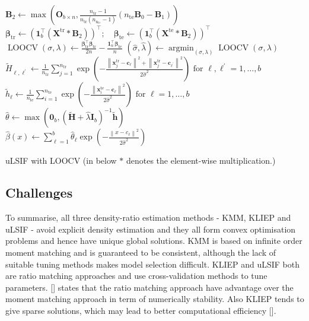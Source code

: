 \documentclass[a4paper,12pt]{article}
\begin{document}
\begin{algorithm}
{{$\boldsymbol{B}_{2} \longleftarrow \max \left(\boldsymbol{O}_{b \times n}, \frac{n_{\mathrm{tr}}-1}{n_{\mathrm{tr}}\left(n_{\mathrm{n}_{te}}-1\right)}\left(n_{\mathrm{te}} \boldsymbol{B}_{0}-\boldsymbol{B}_{1}\right)\right)$ \;
$\boldsymbol{\beta}_{\mathrm{tr}} \longleftarrow\left(\mathbf{1}_{b}^{\top}\left(\boldsymbol{X}^{\mathrm{tr}} * \boldsymbol{B}_{2}\right)\right)^{\top} ; \quad \boldsymbol{\beta}_{\mathrm{te}} \longleftarrow\left(\mathbf{1}_{b}^{\top}\left(\boldsymbol{X}^{\mathrm{te}} * \boldsymbol{B}_{2}\right)\right)^{\top} $ \;
$\operatorname{LOOCV}(\sigma, \lambda) \longleftarrow \frac{\boldsymbol{\beta}_{\mathrm{tr}}^{\top} \boldsymbol{\beta}_{\mathrm{tr}}}{2 n}-\frac{\mathbf{1}_{n}^{\top} \boldsymbol{\beta}_{\mathrm{te}}}{n}$\;}}
$(\hat{\sigma}, \hat{\lambda}) \longleftarrow \operatorname{argmin}_{(\sigma, \lambda)} \operatorname{LOOCV}(\sigma, \lambda)$\\
$\tilde{H}_{\ell, \ell^{\prime}} \longleftarrow \frac{1}{n_{\mathrm{tr}}} \sum_{j=1}^{n_{\mathrm{tr}}} \exp \left(-\frac{\left\|\boldsymbol{x}_{j}^{\mathrm{tr}}-\boldsymbol{c}_{\ell}\right\|^{2}+\left\|\boldsymbol{x}_{j}^{\mathrm{tr}}-\boldsymbol{c}_{\ell^{\prime}}\right\|^{2}}{2 \widehat{\sigma}^{2}}\right) \text { for } \ell, \ell^{\prime}=1, \ldots, b$\\
$\tilde{h}_{\ell} \longleftarrow \frac{1}{n_{\mathrm{te}}} \sum_{i=1}^{n_{\mathrm{te}}} \exp \left(-\frac{\left\|\boldsymbol{x}_{i}^{\mathrm{te}}-\boldsymbol{c}_{\boldsymbol{\ell}}\right\|^{2}}{2 \widehat{\sigma}^{2}}\right) \text { for } \ell=1, \ldots, b$\\
$\hat{\theta} \longleftarrow \max \left(\mathbf{0}_{b},\left(\widetilde{\boldsymbol{H}}+\widehat{\lambda} \boldsymbol{I}_{b}\right)^{-1} \widetilde{\boldsymbol{h}}\right)$\\
$\widehat{\beta}(x) \longleftarrow \sum^{b}_{\ell = 1} \widehat{\theta}_{\ell} \exp \left(-\frac{\left\|x-c_{\ell}\right\|^{2}}{2 \widehat{\sigma}^{2}}\right)$
\caption{uLSIF with LOOCV (in below $*$ denotes the element-wise multiplication.)}
\label{ulsif algo}
\end{algorithm}

\subsection{Challenges} \label{challenges}
To summarise, all three density-ratio estimation methods - KMM, KLIEP and uLSIF - avoid explicit density estimation and they all form convex optimisation problems and hence have unique global solutions. KMM is based on infinite order moment matching and is guaranteed to be consistent, although the lack of suitable tuning methods makes model selection difficult. KLIEP and uLSIF both are ratio matching approaches and use cross-validation methods to tune parameters. [\cite{kanamori2009condition}] states that the ratio matching approach have advantage over the moment matching approach in term of numerically stability. Also KLIEP tends to give sparse solutions, which may lead to better computational efficiency [\cite{tsuboi2009direct}]. 
\end{document}
